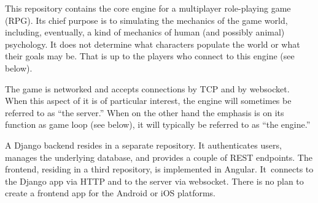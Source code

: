This repository contains the core engine for a multiplayer role-playing game
(RPG).
Its chief purpose is to simulating the mechanics of the game world, including,
eventually, a kind of mechanics of human (and possibly animal) psychology.
It does not determine what characters populate the world or what their goals
may be.
That is up to the players who connect to this engine (see below).

The game is networked and accepts connections by TCP and by websocket.
When this aspect of it is of particular interest, the engine will sometimes be
referred to as ``the server.''
When on the other hand the emphasis is on its function as game loop (see below),
it will typically be referred to as ``the engine.''

A Django backend resides in a separate repository.
It authenticates users, manages the underlying database, and provides a couple
of REST endpoints.
The frontend, residing in a third repository, is implemented in Angular.
It~connects to the Django app via HTTP and to the server via websocket.
There is no plan to create a frontend app for the Android or iOS platforms.
